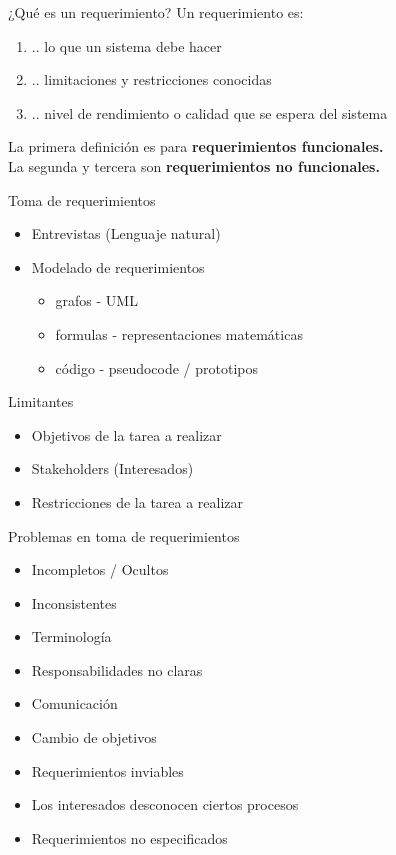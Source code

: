 \documentclass[
  24pt, %
  aspectratio=169, %
]{beamer}
\begin{document}
\begin{frame}{¿Qué es un requerimiento?}
  Un requerimiento es:
  \begin{enumerate}
  \item .. lo que un sistema debe hacer
  \item .. limitaciones y restricciones conocidas
  \item .. nivel de rendimiento o calidad que se espera del sistema
  \end{enumerate}
  \vspace{0.5cm}
  \pause
  
  La primera definición es para \textbf{requerimientos funcionales.}\\
  La segunda y tercera son \textbf{requerimientos no funcionales.}
  
\end{frame}

\begin{frame}{Toma de requerimientos}
  \begin{itemize}
  \item Entrevistas (Lenguaje natural)
  \item Modelado de requerimientos
    \begin{itemize}
    \item grafos - UML
    \item formulas - representaciones matemáticas
    \item código - pseudocode / prototipos
    \end{itemize}
  \end{itemize}
  \vspace{0.5cm}
  \pause
  Limitantes
  \begin{itemize}
  \item Objetivos de la tarea a realizar
  \item Stakeholders (Interesados)
  \item Restricciones de la tarea a realizar
  \end{itemize}
\end{frame}

\begin{frame}{Problemas en toma de requerimientos}
  \begin{itemize}
  \item Incompletos / Ocultos 
  \item Inconsistentes
  \item Terminología
  \item Responsabilidades no claras
  \item Comunicación
  \item Cambio de objetivos
  \item Requerimientos inviables
  \item Los interesados desconocen ciertos procesos
  \item Requerimientos no especificados
  \end{itemize}
\end{frame}
\end{document}
